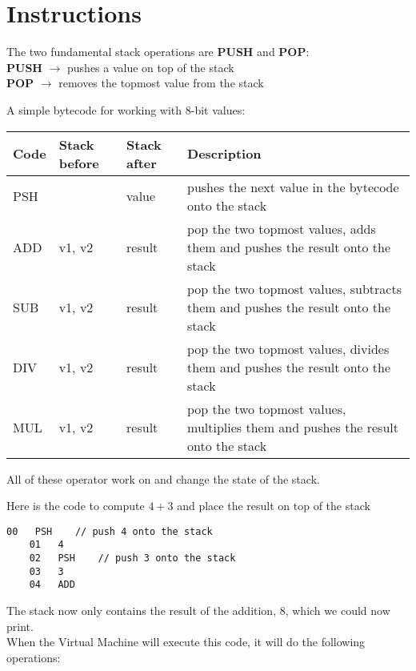 \documentclass{article}
\begin{document}
\section{Instructions}

The two fundamental stack operations are \textbf{PUSH} and \textbf{POP}:
\\
\textbf{PUSH} \(\rightarrow\) pushes a value on top of the stack
\\
\textbf{POP} \(\rightarrow\) removes the topmost value from the stack

A simple bytecode for working with 8-bit values:

\bgroup{}
\def\arraystretch{1.25}
\begin{center}
    \begin{tabular}{ |l|l|l|p{7cm}| }
        \hline
        \textbf{Code} & \textbf{Stack before} & \textbf{Stack after} & \textbf{Description} \\
        \hline
        PSH &  & value & pushes the next value in the bytecode onto the stack \\
        \hline
        ADD & v1, v2 & result & pop the two topmost values, adds them and pushes the result onto the stack \\
        \hline
        SUB & v1, v2 & result & pop the two topmost values, subtracts them and pushes the result onto the stack \\
        \hline
        DIV & v1, v2 & result & pop the two topmost values, divides them and pushes the result onto the stack \\
        \hline
        MUL & v1, v2 & result & pop the two topmost values, multiplies them and pushes the result onto the stack \\
        \hline
    \end{tabular}
\end{center}
\egroup{}

All of these operator work on and change the state of the stack.

Here is the code to compute \(4+3\) and place the result on top of the stack

\begin{lstlisting}[style=generic]
    00   PSH    // push 4 onto the stack
    01   4
    02   PSH    // push 3 onto the stack
    03   3
    04   ADD
\end{lstlisting}

The stack now only contains the result of the addition, 8, which we could now print.
\\
When the Virtual Machine will execute this code, it will do the following operations:
\end{document}
